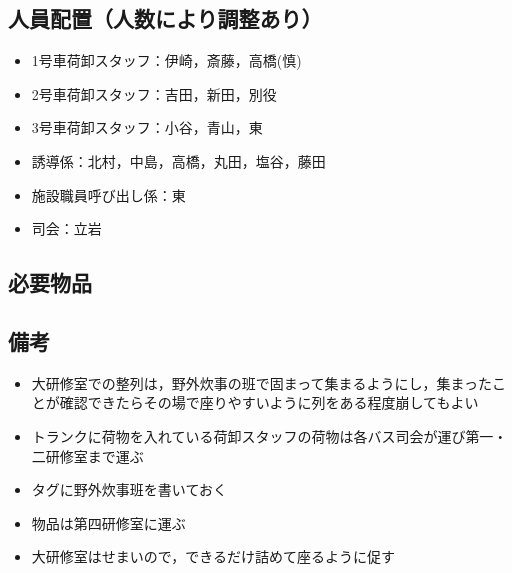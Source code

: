 \subsection{人員配置（人数により調整あり）}
\begin{itemize}

\item 1号車荷卸スタッフ：伊崎，斎藤，高橋(慎)
\item 2号車荷卸スタッフ：吉田，新田，別役

\item 3号車荷卸スタッフ：小谷，青山，東

\item 誘導係：北村，中島，高橋，丸田，塩谷，藤田

\item 施設職員呼び出し係：東
\item 司会：立岩
\end{itemize}


\subsection{必要物品}



\subsection{備考}
\begin{itemize}
\item 大研修室での整列は，野外炊事の班で固まって集まるようにし，集まったことが確認できたらその場で座りやすいように列をある程度崩してもよい
\item トランクに荷物を入れている荷卸スタッフの荷物は各バス司会が運び第一・二研修室まで運ぶ
\item タグに野外炊事班を書いておく
\item 物品は第四研修室に運ぶ
\item 大研修室はせまいので，できるだけ詰めて座るように促す
\end{itemize}


%
